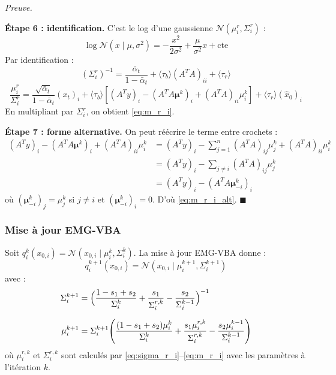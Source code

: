 \documentclass[12pt]{article}
\newcommand{\alt}{\bar\alpha_t}
\renewcommand{\qedsymbol}{$\blacksquare$}
\renewenvironment{proof}[1][\proofname]{%
  \par\medskip\noindent
  \textit{\color{proofgray}#1.}\enspace\ignorespaces
}{\hfill\qedsymbol\par\medskip}
\renewcommand{\proofname}{Preuve}
\begin{document}
\begin{proof}
\textbf{Étape 6 : identification.} C'est le log d'une gaussienne $\mathcal{N}(\mu_i^r, \Sigma_i^r)$ :
\[
\log \mathcal{N}(x \mid \mu, \sigma^2) = -\frac{x^2}{2\sigma^2} + \frac{\mu}{\sigma^2}x + \mathrm{cte}
\]
Par identification :
\[
(\Sigma_i^r)^{-1} = \frac{\alt}{1-\alt} + \langle\tau_b\rangle (A^T A)_{ii} + \langle\tau_r\rangle
\]
\[
\frac{\mu_i^r}{\Sigma_i^r} = \frac{\sqrt{\alt}}{1-\alt}(x_t)_i + \langle\tau_b\rangle \left[(A^T y)_i - (A^T A \boldsymbol{\mu}^k)_i + (A^T A)_{ii}\mu_i^k\right] + \langle\tau_r\rangle (\hat{x}_0)_i
\]
En multipliant par $\Sigma_i^r$, on obtient \eqref{eq:m_r_i}.

\textbf{Étape 7 : forme alternative.} On peut réécrire le terme entre crochets :
\begin{align}
    (A^T y)_i - (A^T A \boldsymbol{\mu}^k)_i + (A^T A)_{ii}\mu_i^k &= (A^T y)_i - \sum_{j=1}^n (A^T A)_{ij}\mu_j^k + (A^T A)_{ii}\mu_i^k \nonumber\\[4pt]
    &= (A^T y)_i - \sum_{j \neq i} (A^T A)_{ij}\mu_j^k \nonumber\\[4pt]
    &= (A^T y)_i - (A^T A \boldsymbol{\mu}^k_{-i})_i
\end{align}
où $(\boldsymbol{\mu}^k_{-i})_j = \mu_j^k$ si $j \neq i$ et $(\boldsymbol{\mu}^k_{-i})_i = 0$. D'où \eqref{eq:m_r_i_alt}.
\end{proof}




\subsubsection{Mise à jour EMG-VBA }

\begin{propositionbox}
\label{prop:update_x0i}
Soit $q_i^k(x_{0,i}) = \mathcal{N}(x_{0,i} \mid \mu_i^k, \Sigma_i^k)$. La mise à jour EMG-VBA donne :
\begin{equation}
    \boxed{q_i^{k+1}(x_{0,i}) = \mathcal{N}(x_{0,i} \mid \mu_i^{k+1}, \Sigma_i^{k+1})}
\end{equation}
avec :
\begin{align}
   \Sigma_i^{k+1} &= \Bigl( \frac{1-s_1+s_2}{\Sigma_i^{k}} + \frac{s_1}{\Sigma_i^{r,k}} - \frac{s_2}{\Sigma_i^{k-1}} \label{eq:sigma_x0_update} \Bigr)^{-1} \\[6pt]
    \mu_i^{k+1} &= \Sigma_i^{k+1} \Biggl( \frac{(1-s_1+s_2)\mu_i^k}{\Sigma_i^{k}} + \frac{s_1\mu_i^{r,k}}{\Sigma_i^{r,k}} - \frac{s_2\mu_i^{k-1}}{\Sigma_i^{k-1}}  \label{eq:m_x0_update} \Biggr)
\end{align}
où $\mu_i^{r,k}$ et $\Sigma_i^{r,k}$ sont calculés par \eqref{eq:sigma_r_i}--\eqref{eq:m_r_i} avec les paramètres à l'itération $k$.
\end{propositionbox}
\end{document}
